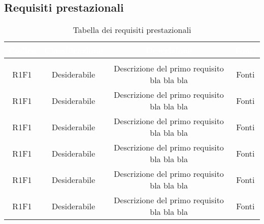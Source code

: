 \subsection{Requisiti prestazionali}
\renewcommand{\arraystretch}{1.5}
\begin{center}
\begin{longtable}{C{\colA} C{\colB} C{\colC} C{\colA}}
		\textcolor{white}{\textbf{Codice}} & 
		\textcolor{white}{\textbf{Classificazione}} & 
		\textcolor{white}{\textbf{Descrizione}} & 
		\textcolor{white}{\textbf{Fonti}} \\
		\endfirsthead
	    \\
	    \endfoot
	    \caption{Tabella dei requisiti prestazionali}
	    \endlastfoot

R1F1 & Desiderabile & Descrizione del primo requisito bla bla bla & Fonti \\
R1F1 & Desiderabile & Descrizione del primo requisito bla bla bla & Fonti \\
R1F1 & Desiderabile & Descrizione del primo requisito bla bla bla & Fonti \\
R1F1 & Desiderabile & Descrizione del primo requisito bla bla bla & Fonti \\
R1F1 & Desiderabile & Descrizione del primo requisito bla bla bla & Fonti \\
R1F1 & Desiderabile & Descrizione del primo requisito bla bla bla & Fonti \\
\end{longtable}
\end{center}